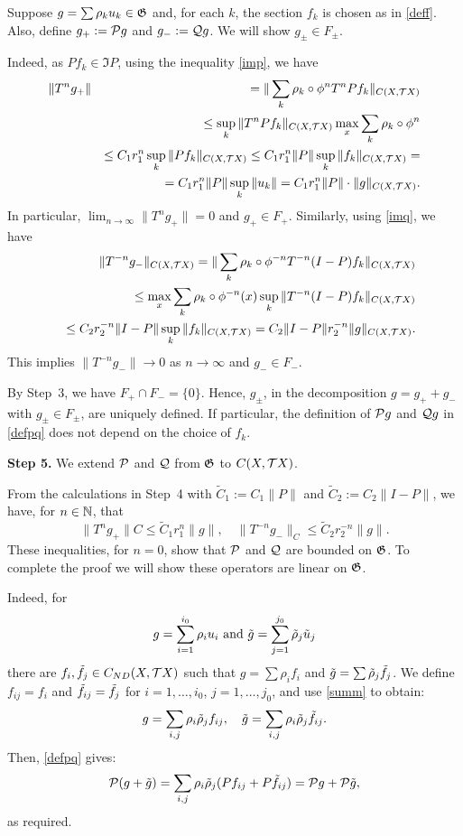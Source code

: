 \begin{pf}
Suppose $g=\sum \rho_k u_k\in\frak G$ and, for each $k$, the
section  $f_k$ is chosen as in \eqref{deff}.
Also, define $g_{+}:={\cal{P}} g$ and $ g_{-}:={\cal{Q}} g$.
We will show $ g_{\pm}\in F_{\pm}$.

Indeed, as $Pf_k\in \Im P$, using the  inequality
\eqref{imp}, we have
\begin{eqnarray*}
&\| T^n g_{+} \| &=  \| \sum_k \rho_k \circ
\phi^n T^n Pf_k\|_{C(X,{{\cal{T}}X})} \\
&& \le \sup_k \| T^n Pf_k\|_{C(X,{{\cal{T}}X})}
\max_x \sum_k \rho_k \circ \phi^n\\
&& \le  C_1r^n_1\sup_k \| Pf_k\|_{C(X,{{\cal{T}}X})}
\le C_1r^n_1\| P\|\sup_k\| f_k\|_{C(X,{{\cal{T}}X})} =\\
&& =  C_1 r^n_1\|P\|\sup_k \|u_k\| =
C_1 r^n_1\| P\|\cdot\| g\|_{C(X,{{\cal{T}}X})}.
\end{eqnarray*}
In particular, $\lim_{n\to \infty}\| T^n g_{+} \|=0$ and
$g_{+}\in F_{+}$.
Similarly, using \eqref{imq}, we have
\begin{eqnarray*}
&&\|T^{-n}g_{-}\|_{C(X,{{\cal{T}}X})} =  \|\sum_k\rho_k
\circ\phi^{-n} T^{-n} (I-P)f_k\|_{C(X,{{\cal{T}}X})}  \\
&& \le \max_x \sum_k \rho_k\circ
\phi^{-n}(x) \sup_k \|T^{-n} (I-P)f_k\|_{C(X,{{\cal{T}}X})} \\
&&\le  C_2 r^{-n}_2 \|I-P\| \sup_k \| f_k\|_{C(X,{{\cal{T}}X})} = C_2 \| I-P \|
r^{-n}_2 \|g\|_{C(X,{{\cal{T}}X})}.
\end{eqnarray*}
This implies
$\|T^{-n} g_{-} \| \to 0$ as
$n\to\infty$
and $g_{-}\in F_{-}$.

By Step~3, we have  $F_{+} \cap F_{-} = \{0\}$.
Hence, $g_{\pm}$, in the decomposition $g=g_++g_-$ with
$g_{\pm}\in F_{\pm}$, are uniquely defined.
If particular, the definition of ${\cal{P}} g$ and ${\cal{Q}} g$ in
\eqref{defpq} does not depend on the choice of $f_k$.

{\bf Step 5.} We extend ${\cal{P}}$ and ${\cal{Q}}$ from $\frak G$ to
${C(X,{{\cal{T}}X})}$.

{}From the  calculations in Step~4 with
$\tilde C_1:= C_1 \|P\|$ and $\tilde C_2:=C_2\| I-P\|$,
we have, for  $n\in{\Bbb{N}}$, that
\begin{equation*}
 \|T^n g_{+}\| C \le \tilde C_1
r^n_1 \|g\|,\quad
 \|T^{-n} g_{-}\|_C \le \tilde C_2
r^{-n}_2 \|g\|.
\end{equation*}
These inequalities, for $n=0$, show that ${\cal{P}}$ and ${\cal{Q}}$ are bounded
on $\frak G$. To complete the proof we will show
these operators are linear on $\frak G$.

Indeed, for
\[
g=\sum_{i=1}^{i_0} \rho_i u_i \text{ and  }
\ti{g}=\sum_{j=1}^{j_0} \ti{\rho}_j\ti{u}_j
\]
there are $f_i,\tilde{f}_j\in{C_{ND}(X,{{\cal{T}}X})}$ such that $g=\sum \rho_if_i$ and
$\tilde{g}=\sum\tilde{\rho}_j\tilde{f}_j$. We define $f_{ij}=f_i$
 and $\tilde{f}_{ij}=\tilde{f}_j$ for $i=1,\dots,i_0$, $j=1,\dots,j_0$,
and use \eqref{summ} to obtain:
\[ g=\sum_{i,j}\rho_i\tilde{\rho}_jf_{ij},\quad
\tilde{g}=\sum_{i,j}\rho_i\tilde{\rho}_j\tilde{f}_{ij}.\]
Then, \eqref{defpq} gives:
\[ {\cal{P}} (g+\tilde{g})=\sum_{i,j}\rho_i\tilde{\rho}_j(Pf_{ij}+P\tilde{f}_{ij})=
{\cal{P}} g +{\cal{P}}\tilde{g},\]
as required.
\end{pf}

